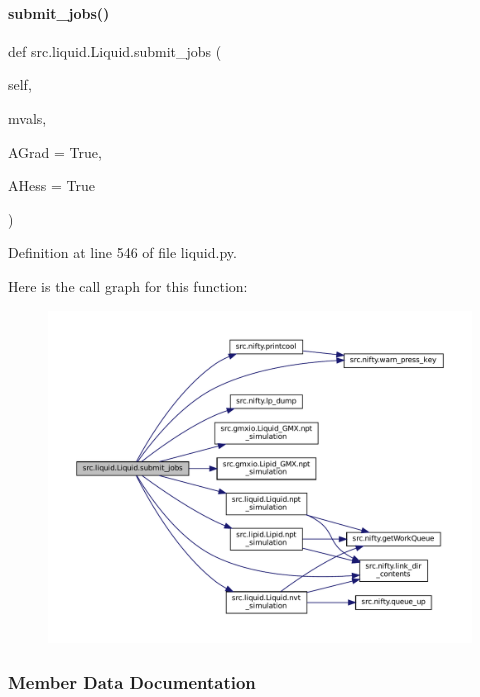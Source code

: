 \paragraph{\texorpdfstring{submit\+\_\+jobs()}{submit\_jobs()}}
{\footnotesize\ttfamily def src.\+liquid.\+Liquid.\+submit\+\_\+jobs (\begin{DoxyParamCaption}\item[{}]{self,  }\item[{}]{mvals,  }\item[{}]{A\+Grad = {\ttfamily True},  }\item[{}]{A\+Hess = {\ttfamily True} }\end{DoxyParamCaption})}



Definition at line 546 of file liquid.\+py.

Here is the call graph for this function\+:
\nopagebreak
\begin{figure}[H]
\begin{center}
\leavevmode
\includegraphics[width=350pt]{classsrc_1_1liquid_1_1Liquid_adb3676bf501d6683c2a8f36b10270a82_cgraph}
\end{center}
\end{figure}


\subsubsection{Member Data Documentation}
\mbox{\label{classsrc_1_1liquid_1_1Liquid_aff804d628027f3d20892fbe5ef0452f2}} 
